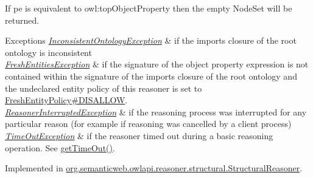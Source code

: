If {\ttfamily pe} is equivalent to {\ttfamily owl\-:top\-Object\-Property} then the empty {\ttfamily Node\-Set} will be returned.


\begin{DoxyExceptions}{Exceptions}
{\em \hyperlink{classorg_1_1semanticweb_1_1owlapi_1_1reasoner_1_1_inconsistent_ontology_exception}{Inconsistent\-Ontology\-Exception}} & if the imports closure of the root ontology is inconsistent \\
\hline
{\em \hyperlink{classorg_1_1semanticweb_1_1owlapi_1_1reasoner_1_1_fresh_entities_exception}{Fresh\-Entities\-Exception}} & if the signature of the object property expression is not contained within the signature of the imports closure of the root ontology and the undeclared entity policy of this reasoner is set to \hyperlink{enumorg_1_1semanticweb_1_1owlapi_1_1reasoner_1_1_fresh_entity_policy_a762eae6d5b2449d125311ecaabfdc8d0}{Fresh\-Entity\-Policy\#\-D\-I\-S\-A\-L\-L\-O\-W}. \\
\hline
{\em \hyperlink{classorg_1_1semanticweb_1_1owlapi_1_1reasoner_1_1_reasoner_interrupted_exception}{Reasoner\-Interrupted\-Exception}} & if the reasoning process was interrupted for any particular reason (for example if reasoning was cancelled by a client process) \\
\hline
{\em \hyperlink{classorg_1_1semanticweb_1_1owlapi_1_1reasoner_1_1_time_out_exception}{Time\-Out\-Exception}} & if the reasoner timed out during a basic reasoning operation. See \hyperlink{interfaceorg_1_1semanticweb_1_1owlapi_1_1reasoner_1_1_o_w_l_reasoner_a44b2c968f989afe5290db29c90faa164}{get\-Time\-Out()}. \\
\hline
\end{DoxyExceptions}


Implemented in \hyperlink{classorg_1_1semanticweb_1_1owlapi_1_1reasoner_1_1structural_1_1_structural_reasoner_abacb01a7f4d61ff377785063de0cb67e}{org.\-semanticweb.\-owlapi.\-reasoner.\-structural.\-Structural\-Reasoner}.

